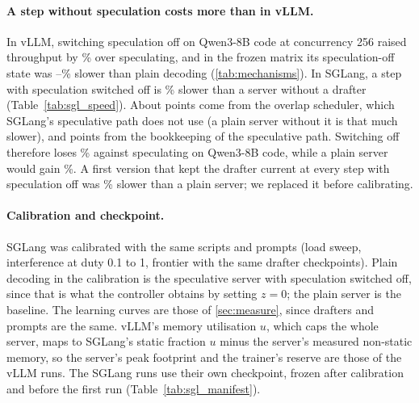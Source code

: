 \begin{table}[t]
\caption{SGLang output throughput (tokens/s) on code prompts: one speculative server with speculation on (acceptance in parentheses) and switched off, and a server without a drafter with and without SGLang's overlap scheduler. --: not measured.}
\label{tab:sgl_speed}
\centering\small
{}
\end{table}

\paragraph{A step without speculation costs more than in vLLM.} In vLLM, switching speculation off on Qwen3-8B code at concurrency 256 raised throughput by \% over speculating, and in the frozen matrix its speculation-off state was --\% slower than plain decoding (\cref{tab:mechanisms}). In SGLang, a step with speculation switched off is \% slower than a server without a drafter (Table~\ref{tab:sgl_speed}). About  points come from the overlap scheduler, which SGLang's speculative path does not use (a plain server without it is that much slower), and  points from the bookkeeping of the speculative path. Switching off therefore loses \% against speculating on Qwen3-8B code, while a plain server would gain \%. A first version that kept the drafter current at every step with speculation off was \% slower than a plain server; we replaced it before calibrating.

\paragraph{Calibration and checkpoint.} SGLang was calibrated with the same scripts and prompts (load sweep, interference at duty 0.1 to 1, frontier with the same drafter checkpoints). Plain decoding in the calibration is the speculative server with speculation switched off, since that is what the controller obtains by setting $z{=}0$; the plain server is the  baseline. The learning curves are those of \cref{sec:measure}, since drafters and prompts are the same. vLLM's memory utilisation $u$, which caps the whole server, maps to SGLang's static fraction $u$ minus the server's measured non-static memory, so the server's peak footprint and the trainer's reserve are those of the vLLM runs. The SGLang runs use their own checkpoint, frozen after calibration and before the first run (Table~\ref{tab:sgl_manifest}).

